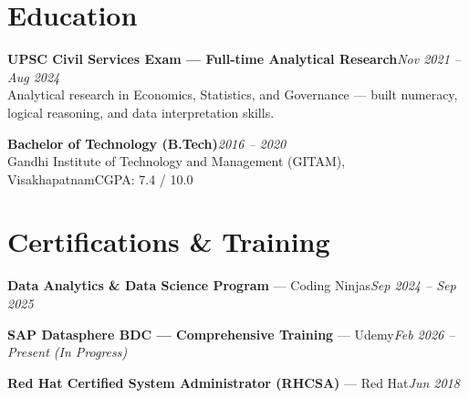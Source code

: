 \documentclass[10pt, letterpaper]{article}
\begin{document}
\section{Education}

{\bfseries UPSC Civil Services Exam — Full-time Analytical Research}\hfill{\small\color{muted}\textit{Nov 2021 – Aug 2024}}\\
{\small\color{muted}Analytical research in Economics, Statistics, and Governance — built numeracy, logical reasoning, and data interpretation skills.}

\vspace{2pt}
{\bfseries Bachelor of Technology (B.Tech)}\hfill{\small\color{muted}\textit{2016 – 2020}}\\
{\small\color{muted}Gandhi Institute of Technology and Management (GITAM), Visakhapatnam\hfill CGPA: 7.4 / 10.0}

\section{Certifications \& Training}

{\bfseries Data Analytics \& Data Science Program} — Coding Ninjas\hfill{\small\color{muted}\textit{Sep 2024 – Sep 2025}}

\vspace{1pt}
{\bfseries SAP Datasphere BDC — Comprehensive Training} — Udemy\hfill{\small\color{muted}\textit{Feb 2026 – Present \emph{(In Progress)}}}

\vspace{1pt}
{\bfseries Red Hat Certified System Administrator (RHCSA)} — Red Hat\hfill{\small\color{muted}\textit{Jun 2018}}

\end{document}
